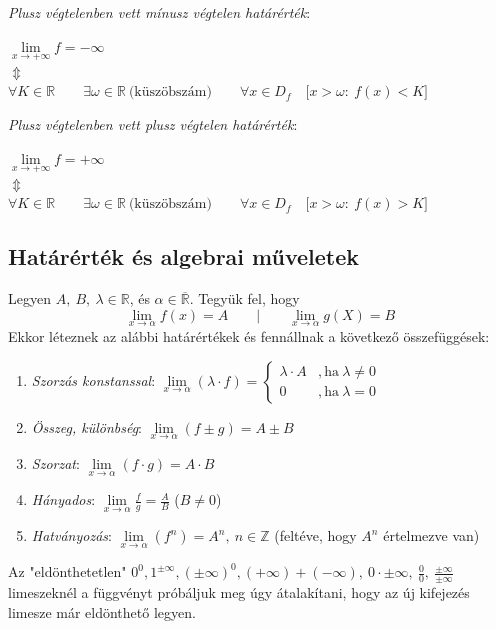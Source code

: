 \documentclass[tikz,12pt,margin=0px]{article}
\newcommand\ddfrac[2]{\frac{\displaystyle #1}{\displaystyle #2}}
\begin{document}
    \noindent \emph{Plusz végtelenben vett mínusz végtelen határérték}:
    \begin{center}
        $\lim\limits_{x \to \boldsymbol{+\infty}}f = \boldsymbol{-\infty}$\\
        $\Updownarrow$\\
        $\forall K \in \mathbb{R} \qquad \exists \omega \in \mathbb{R}\ \text{(küszöbszám)} \qquad \forall x \in D_{f}\quad \Big[x \boldsymbol{>} \omega:\ f(x) \boldsymbol{<} K\Big]$
    \end{center}
    \noindent \emph{Plusz végtelenben vett plusz végtelen határérték}:
    \begin{center}
        $\lim\limits_{x \to \boldsymbol{+\infty}}f = \boldsymbol{+\infty}$\\
        $\Updownarrow$\\
        $\forall K \in \mathbb{R} \qquad \exists \omega \in \mathbb{R}\ \text{(küszöbszám)} \qquad \forall x \in D_{f}\quad \Big[x \boldsymbol{>} \omega:\ f(x) \boldsymbol{>} K\Big]$
    \end{center}

    \subsection*{Határérték és algebrai műveletek}

    Legyen $A,\ B,\ \lambda \in \mathbb{R}$, és $\alpha \in \overline{\mathbb{R}}$. Tegyük fel, hogy
    \[
        \lim_{x \to \alpha} f(x) = A\qquad \Big|\qquad \lim_{x \to \alpha}g(X) = B
    \]
    Ekkor léteznek az alábbi határértékek és fennállnak a következő összefüggések:
    \begin{enumerate}
      \item \emph{Szorzás konstanssal}: $\lim\limits_{x \to \alpha} (\lambda \cdot f) = \left\{ \begin{array}{rl}
                                                                                          \lambda \cdot A &, \text{ha}\ \lambda \neq 0 \\
                                                                                          0 &, \text{ha}\ \lambda = 0
                                                                                        \end{array} \right.
      $
      \item \emph{Összeg, különbség}: $\lim\limits_{x \to \alpha} (f \pm g) = A \pm B$
      \item \emph{Szorzat}: $\lim\limits_{x \to \alpha} (f \cdot g) = A \cdot B$
      \item \emph{Hányados}: $\lim\limits_{x \to \alpha}\ddfrac{f}{g} = \ddfrac{A}{B}$ ($B \neq 0$)
      \item \emph{Hatványozás}: $\lim\limits_{x \to \alpha} (f^{n}) = A^{n},\ n \in \mathbb{Z}$ (feltéve, hogy $A^{n}$ értelmezve van)
    \end{enumerate}
\newpage
    \noindent Az "eldönthetetlen" $0^{0}, 1^{\pm\infty}, (\pm\infty)^{0}, (+\infty) + (-\infty),\ 0 \cdot \pm\infty,\ \ddfrac{0}{0},\ \ddfrac{\pm\infty}{\pm\infty}$ limeszeknél a függvényt próbáljuk meg úgy átalakítani, hogy az új kifejezés limesze már eldönthető legyen.\\
\end{document}
